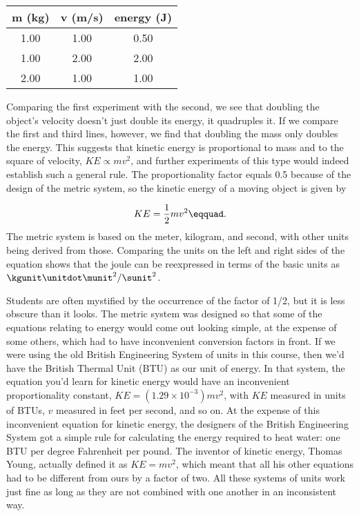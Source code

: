 \begin{tabular}{|c|c|c|} \hline
\textbf{m} (kg) & \textbf{v} (m/s) & \textbf{energy} (J) \\ \hline
1.00 & 1.00 & 0.50 \\ \hline
1.00 & 2.00 & 2.00 \\ \hline
2.00 & 1.00 & 1.00 \\ \hline
\end{tabular}

Comparing the first experiment with the second, we see that
doubling the object's velocity doesn't just double its
energy, it quadruples it. If we compare the first and third
lines, however, we find that doubling the mass only doubles
the energy. This suggests that kinetic energy is proportional
to mass and to the square of velocity, $KE\propto mv^2$, and further
experiments of this type would indeed establish such a
general rule. The proportionality factor equals 0.5 because
of the design of the metric system, so the kinetic energy of
a moving object is given by

\begin{equation*}
                KE    =    \frac{1}{2}mv^2\eqquad.
\end{equation*}
The metric system is based on the meter, kilogram, and
second, with other units being derived from those. Comparing
the units on the left and right sides of the equation shows
that the joule can be reexpressed in terms of the basic
units as $\kgunit\unitdot\munit^2/\sunit^2$.

Students are often mystified by the occurrence of the factor
of 1/2, but it is less obscure than it looks. The metric
system was designed so that some of the equations relating
to energy would come out looking simple, at the expense of
some others, which had to have inconvenient conversion
factors in front. If we were using the old British
Engineering System of units in this course, then we'd have
the British Thermal Unit (BTU) as our unit of energy. In
that system, the equation you'd learn for kinetic energy
would have an inconvenient proportionality constant,
$KE=\left(1.29\times10^{-3}\right)mv^2$, with $KE$ measured
in units of BTUs, $v$ measured in feet per second, and so on.
At the expense of this inconvenient equation for kinetic
energy, the designers of the British Engineering System got
a simple rule for calculating the energy required to heat
water: one BTU per degree Fahrenheit per pound. The
inventor of kinetic energy, Thomas Young, actually defined
it as $KE=mv^2$, which meant that all his other
equations had to be different from ours by a factor of two.
All these systems of units work just fine as long as they
are not combined with one another in an inconsistent way.

